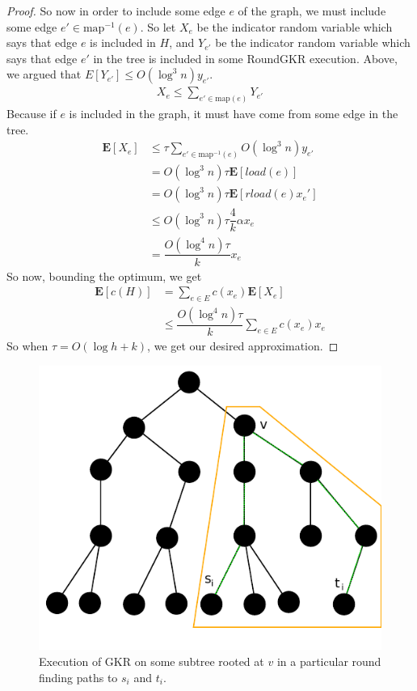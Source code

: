 \documentclass[12pt]{article}
\begin{document}
\begin{proof}
So now in order to include some edge $e$ of the graph, we must include some edge $e' \in \text{map}^{-1}(e)$. So let $X_e$ be the indicator random variable which says that edge $e$ is included in $H$, and $Y_{e'}$ be the indicator random variable which says that edge $e'$ in the tree is included in some RoundGKR execution. Above, we argued that $E[Y_{e'}] \leq O(\log^3 n)y_{e'}$.
\begin{align}
X_e \leq \sum_{e' \in \text{map}(e)} Y_{e'}
\end{align}
Because if $e$ is included in the graph, it must have come from some edge in the tree. 
\begin{align}
 \textbf{E}[X_e] &\leq \tau \sum_{e' \in \text{map}^{-1}(e)} O(\log^3 n) y_{e'} \\
        &= O(\log^3 n) \tau \textbf{E}[load(e)] \\
        &= O(\log^3 n) \tau \textbf{E}[rload(e)x_e'] \\
        &\leq O(\log^3 n) \tau \dfrac{4}{k} \alpha x_e\\
        & = \dfrac{O(\log^4 n)\tau}{k} x_e
\end{align}
So now, bounding the optimum, we get
\begin{align}
\textbf{E}[c(H)] &= \sum_{e \in E} c(x_e)\textbf{E}[X_e] \\
                 &\leq \dfrac{O(\log^4 n)\tau}{k} \sum_{e \in E} c(x_e) x_e
\end{align}
So when $\tau = O(\log h + k)$, we get our desired approximation.
\end{proof}

\begin{figure}
\label{fig:roundgkronnode}
\centering
\includegraphics[width=\linewidth]{RoundGKRonNode.pdf}
\caption{Execution of GKR on some subtree rooted at $v$ in a particular round finding paths to $s_i$ and $t_i$.}
\end{figure}
\end{document}

